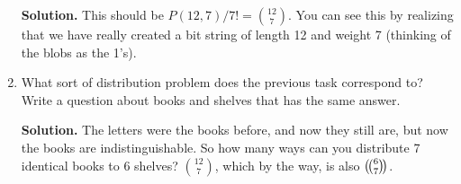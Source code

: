 \documentclass{book}
\begin{document}
\begin{activity}[]
\begin{enumerate}[font=\bfseries,label=(\alph*),ref=\alph*]
\noindent\textbf{Solution.}\hypertarget{solution-98}{}\quad%
\hypertarget{p-898}{}%
This should be \(P(12,7)/7! = \binom{12}{7}\).  You can see this by realizing that we have really created a bit string of length 12 and weight 7 (thinking of the blobs as the 1's).%
\item\label{task-173} \hypertarget{p-899}{}%
What sort of distribution problem does the previous task correspond to?  Write a question about books and shelves that has the same answer.%
\par\smallskip%
\noindent\textbf{Solution.}\hypertarget{solution-99}{}\quad%
\hypertarget{p-900}{}%
The letters were the books before, and now they still are, but now the books are indistinguishable.  So how many ways can you distribute 7 identical books to 6 shelves?  \(\binom{12}{7}\), which by the way, is also \(\left(\!\binom{6}{7}\!\right)\).%
\end{enumerate}
\end{activity}
\end{document}
